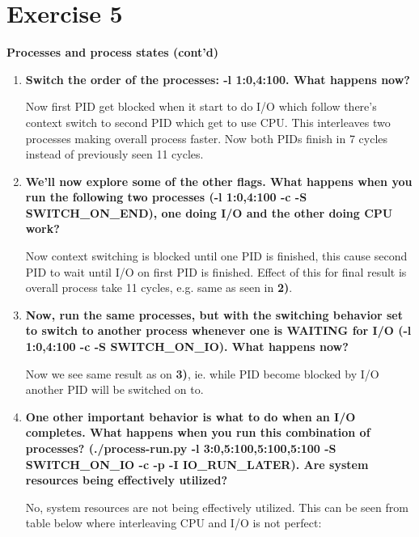 \documentclass{article}
\newcommand{\exercise}[1]{
    \section*{Exercise #1}
    \markboth{Exercise #1}{}
}
\begin{document}
\exercise{5}
\textbf{Processes and process states (cont’d)}

\begin{enumerate}[label=\textbf{\arabic*}), start=3]
    \item
    {\bf Switch the order of the processes: -l
    1:0,4:100. What happens now?}

    Now first PID get blocked when it start to do I/O which
    follow there's context switch to second PID which get to
    use CPU. This interleaves two processes making overall
    process faster. Now both PIDs finish in 7 cycles instead of
    previously seen 11 cycles.

    \item
    {\bf We’ll now explore some of the other flags. What happens
    when you run the following two processes (-l 1:0,4:100
    -c \linebreak -S SWITCH\_ON\_END), one doing I/O and the
    other doing CPU work?}

    Now context switching is blocked until one PID is finished,
    this cause second PID to wait until I/O on first PID is
    finished. Effect of this for final result is overall process
    take 11 cycles, e.g. same as seen in {\bf 2)}.

    \item
    {\bf Now, run the same processes, but with the switching
    behavior set to switch to another process whenever one
    is WAITING for I/O (-l 1:0,4:100 -c -S SWITCH\_ON\_IO).
    What happens now?}

    Now we see same result as on {\bf 3)}, ie. while PID become
    blocked by I/O another PID will be switched on to.
\pagebreak
    \item 
    {\bf  One other important behavior is what to do when
    an I/O completes. What happens when you run this combination
    of processes? (./process-run.py -l 3:0,5:100,5:100,5:100
    -S SWITCH\_ON\_IO -c -p -I IO\_RUN\_LATER). Are system
    resources being effectively utilized?}

    No, system resources are not being effectively utilized.
    This can be seen from table below where interleaving
    CPU and I/O is not perfect:

    {\scriptsize

}
\end{enumerate}
\end{document}
